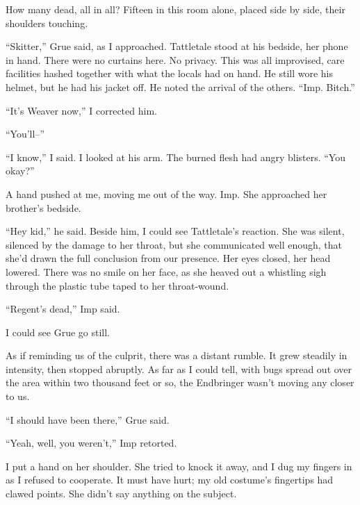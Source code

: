 How many dead, all in all?  Fifteen in this room alone, placed side by side, their shoulders touching.



``Skitter,'' Grue said, as I approached. Tattletale stood at his bedside, her phone in hand.  There were no curtains here.  No privacy.  This was all improvised, care facilities hashed together with what the locals had on hand.  He still wore his helmet, but he had his jacket off.  He noted the arrival of the others.  ``Imp.  Bitch.''



``It's Weaver now,'' I corrected him.



``You'll--''



``I know,'' I said.  I looked at his arm.  The burned flesh had angry blisters.  ``You okay?''



A hand pushed at me, moving me out of the way.  Imp.  She approached her brother's bedside.



``Hey kid,'' he said.  Beside him, I could see Tattletale's reaction.  She was silent, silenced by the damage to her throat, but she communicated well enough, that she'd drawn the full conclusion from our presence.  Her eyes closed, her head lowered.  There was no smile on her face, as she heaved out a whistling sigh through the plastic tube taped to her throat-wound.



``Regent's dead,'' Imp said.



I could see Grue go still.



As if reminding us of the culprit, there was a distant rumble.  It grew steadily in intensity, then stopped abruptly.  As far as I could tell, with bugs spread out over the area within two thousand feet or so, the Endbringer wasn't moving any closer to us.



``I should have been there,'' Grue said.



``Yeah, well, you weren't,'' Imp retorted.



I put a hand on her shoulder.  She tried to knock it away, and I dug my fingers in as I refused to cooperate.  It must have hurt; my old costume's fingertips had clawed points.  She didn't say anything on the subject.



